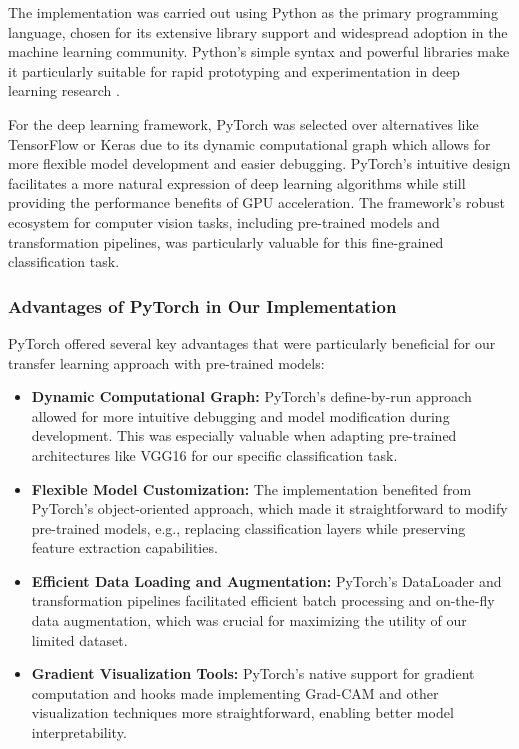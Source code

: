\documentclass[a4paper,12pt]{article}
\begin{document}
The implementation was carried out using Python as the primary programming language, chosen for its extensive library support and widespread adoption in the machine learning community. Python's simple syntax and powerful libraries make it particularly suitable for rapid prototyping and experimentation in deep learning research \citep{geron2019}.

For the deep learning framework, PyTorch was selected over alternatives like TensorFlow or Keras due to its dynamic computational graph which allows for more flexible model development and easier debugging. PyTorch's intuitive design facilitates a more natural expression of deep learning algorithms while still providing the performance benefits of GPU acceleration. The framework's robust ecosystem for computer vision tasks, including pre-trained models and transformation pipelines, was particularly valuable for this fine-grained classification task.

\subsubsection{Advantages of PyTorch in Our Implementation}

PyTorch offered several key advantages that were particularly beneficial for our transfer learning approach with pre-trained models:

\begin{itemize}
    \item \textbf{Dynamic Computational Graph:} PyTorch's define-by-run approach allowed for more intuitive debugging and model modification during development. This was especially valuable when adapting pre-trained architectures like VGG16 for our specific classification task.

    \item \textbf{Flexible Model Customization:} The implementation benefited from PyTorch's object-oriented approach, which made it straightforward to modify pre-trained models, e.g., replacing classification layers while preserving feature extraction capabilities.

    \item \textbf{Efficient Data Loading and Augmentation:} PyTorch's DataLoader and transformation pipelines facilitated efficient batch processing and on-the-fly data augmentation, which was crucial for maximizing the utility of our limited dataset.

    \item \textbf{Gradient Visualization Tools:} PyTorch's native support for gradient computation and hooks made implementing Grad-CAM and other visualization techniques more straightforward, enabling better model interpretability.
\end{itemize}
\end{document}

